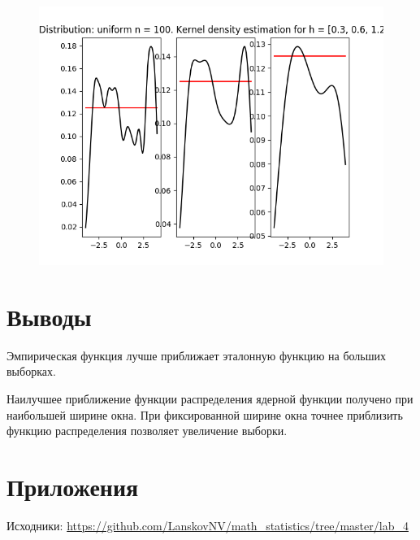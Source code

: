 \documentclass[12pt]{report}
\begin{document}
\begin{center}
\begin{figure}[H]
\includegraphics[width=\textwidth]{../lab_4/pic/kernel/d_uniform100.png}
\end{figure}
\end{center}


\section{Выводы}
Эмпирическая функция лучше приближает эталонную функцию на больших выборках.

Наилучшее приближение функции распределения ядерной функции получено при наибольшей ширине окна. При фиксированной ширине окна точнее приблизить функцию распределения позволяет увеличение выборки.

\section{Приложения}

Исходники: \url{https://github.com/LanskovNV/math_statistics/tree/master/lab_4}

\newpage
\end{document}
